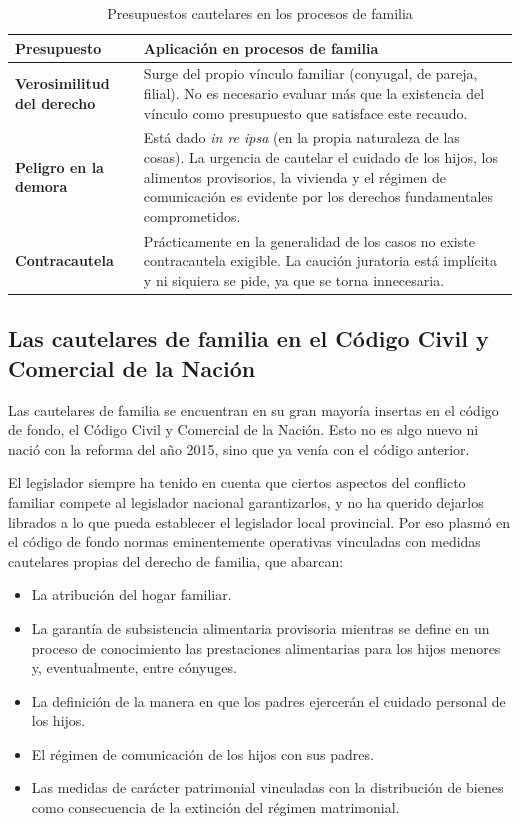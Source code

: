 \documentclass[12pt,oneside]{book}
\begin{document}
\begin{table}[H]
\centering
\small
\begin{tabularx}{\textwidth}{>{\raggedright\arraybackslash}p{3.2cm} >{\raggedright\arraybackslash}X}
\toprule
\textbf{Presupuesto} & \textbf{Aplicación en procesos de familia} \\
\midrule
\textbf{Verosimilitud del derecho} & Surge del propio vínculo familiar (conyugal, de pareja, filial). No es necesario evaluar más que la existencia del vínculo como presupuesto que satisface este recaudo. \\
\addlinespace
\textbf{Peligro en la demora} & Está dado \textit{in re ipsa} (en la propia naturaleza de las cosas). La urgencia de cautelar el cuidado de los hijos, los alimentos provisorios, la vivienda y el régimen de comunicación es evidente por los derechos fundamentales comprometidos. \\
\addlinespace
\textbf{Contracautela} & Prácticamente en la generalidad de los casos no existe contracautela exigible. La caución juratoria está implícita y ni siquiera se pide, ya que se torna innecesaria. \\
\bottomrule
\end{tabularx}
\caption{Presupuestos cautelares en los procesos de familia}
\end{table}

\subsection{Las cautelares de familia en el Código Civil y Comercial de la Nación}

Las cautelares de familia se encuentran en su gran mayoría insertas en el código de fondo, el Código Civil y Comercial de la Nación. Esto no es algo nuevo ni nació con la reforma del año 2015, sino que ya venía con el código anterior.

El legislador siempre ha tenido en cuenta que ciertos aspectos del conflicto familiar compete al legislador nacional garantizarlos, y no ha querido dejarlos librados a lo que pueda establecer el legislador local provincial. Por eso plasmó en el código de fondo normas eminentemente operativas vinculadas con medidas cautelares propias del derecho de familia, que abarcan:
\begin{itemize}
    \item La atribución del hogar familiar.
    \item La garantía de subsistencia alimentaria provisoria mientras se define en un proceso de conocimiento las prestaciones alimentarias para los hijos menores y, eventualmente, entre cónyuges.
    \item La definición de la manera en que los padres ejercerán el cuidado personal de los hijos.
    \item El régimen de comunicación de los hijos con sus padres.
    \item Las medidas de carácter patrimonial vinculadas con la distribución de bienes como consecuencia de la extinción del régimen matrimonial.
\end{itemize}
\end{document}
